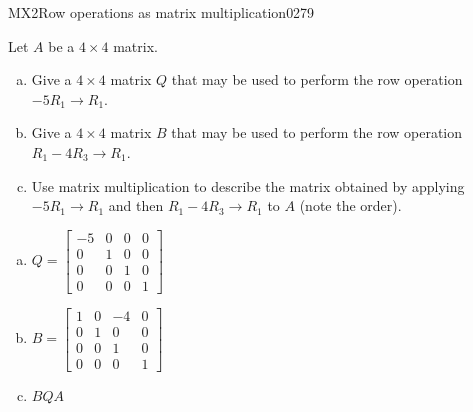 \begin{exercise}{MX2}{Row operations as matrix multiplication}{0279} 
\begin{exerciseStatement} 

Let \(A\) be a \(4 \times 4\) matrix.

 

\begin{enumerate}[(a)]
\item Give a \(4 \times 4\) matrix \(Q\) that may be used to perform the row operation \(-5 R_1 \to R_1\).
\item Give a \(4 \times 4\) matrix \(B\) that may be used to perform the row operation \(R_1 - 4 R_3 \to R_1\).
\item Use matrix multiplication to describe the matrix obtained by applying \(-5 R_1 \to R_1\) and then \(R_1 - 4 R_3 \to R_1\) to \(A\) (note the order). 
\end{enumerate}

     \end{exerciseStatement}
 \begin{exerciseAnswer} 

\begin{enumerate}[(a)]
\item \(Q=\left[\begin{array}{cccc}
-5 & 0 & 0 & 0 \\
0 & 1 & 0 & 0 \\
0 & 0 & 1 & 0 \\
0 & 0 & 0 & 1
\end{array}\right]\)
\item \(B=\left[\begin{array}{cccc}
1 & 0 & -4 & 0 \\
0 & 1 & 0 & 0 \\
0 & 0 & 1 & 0 \\
0 & 0 & 0 & 1
\end{array}\right]\)
\item  \(BQA\) 
\end{enumerate}

     \end{exerciseAnswer}
 \end{exercise}



